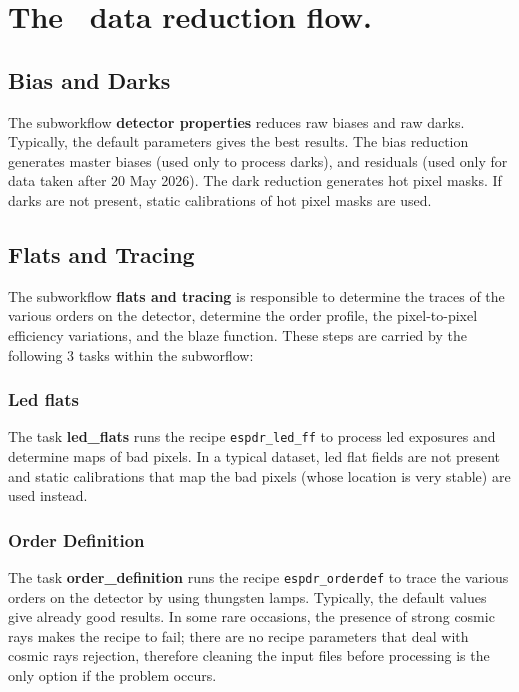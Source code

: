 \section{The \instname\ data reduction flow.}
\label{sec:reduction_flow}


\subsection{Bias and Darks}

The subworkflow {\bf detector properties} reduces raw biases and raw
darks. Typically, the default parameters gives the best results.  The
bias reduction generates master biases (used only to process darks),
and residuals (used only for data taken after 20 May 2026).  The dark
reduction generates hot pixel masks. If darks are not present, static
calibrations of hot pixel masks are used.
   

\subsection{Flats and Tracing}

The subworkflow {\bf flats and tracing} is responsible to determine
the traces of the various orders on the detector, determine the order
profile, the pixel-to-pixel efficiency variations, and the blaze
function. These steps are carried by the following 3 tasks within the
subworflow:

\subsubsection{Led flats}

The task {\bf led\_flats} runs the recipe {\tt espdr\_led\_ff} to
process led exposures and determine maps of bad pixels.  In a typical
dataset, led flat fields are not present and static calibrations that
map the bad pixels (whose location is very stable) are used instead.


\subsubsection{Order Definition}

The task {\bf order\_definition} runs the recipe {\tt espdr\_orderdef}
to trace the various orders on the detector by using thungsten
lamps. Typically, the default values give already good results. In
some rare occasions, the presence of strong cosmic rays makes the
recipe to fail; there are no recipe parameters that deal with cosmic
rays rejection, therefore cleaning the input files before processing
is the only option if the problem occurs.

